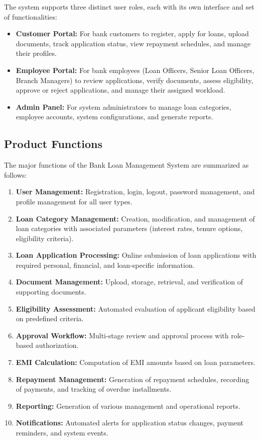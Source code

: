 The system supports three distinct user roles, each with its own interface and set of functionalities:

\begin{itemize}
  \item \textbf{Customer Portal:} For bank customers to register, apply for loans, upload documents, track application status, view repayment schedules, and manage their profiles.
  \item \textbf{Employee Portal:} For bank employees (Loan Officers, Senior Loan Officers, Branch Managers) to review applications, verify documents, assess eligibility, approve or reject applications, and manage their assigned workload.
  \item \textbf{Admin Panel:} For system administrators to manage loan categories, employee accounts, system configurations, and generate reports.
\end{itemize}

\subsection{Product Functions}

The major functions of the Bank Loan Management System are summarized as follows:

\begin{enumerate}
  \item \textbf{User Management:} Registration, login, logout, password management, and profile management for all user types.
  \item \textbf{Loan Category Management:} Creation, modification, and management of loan categories with associated parameters (interest rates, tenure options, eligibility criteria).
  \item \textbf{Loan Application Processing:} Online submission of loan applications with required personal, financial, and loan-specific information.
  \item \textbf{Document Management:} Upload, storage, retrieval, and verification of supporting documents.
  \item \textbf{Eligibility Assessment:} Automated evaluation of applicant eligibility based on predefined criteria.
  \item \textbf{Approval Workflow:} Multi-stage review and approval process with role-based authorization.
  \item \textbf{EMI Calculation:} Computation of EMI amounts based on loan parameters.
  \item \textbf{Repayment Management:} Generation of repayment schedules, recording of payments, and tracking of overdue installments.
  \item \textbf{Reporting:} Generation of various management and operational reports.
  \item \textbf{Notifications:} Automated alerts for application status changes, payment reminders, and system events.
\end{enumerate}

